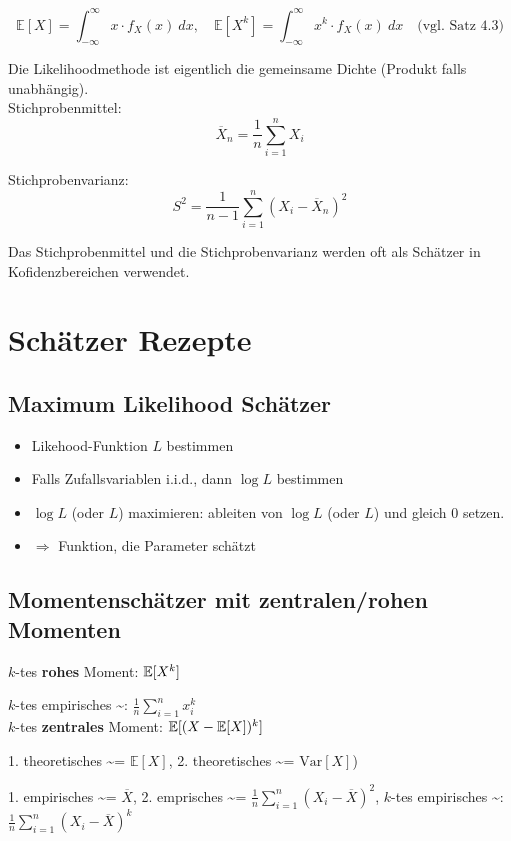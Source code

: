 $$
	\mathbb{E}[X] = \int_{-\infty}^\infty x \cdot f_X(x)\ dx,\quad
	\mathbb{E}[X^k] = \int_{-\infty}^\infty x^k \cdot f_X(x)\ dx\quad
	\text{(vgl. Satz 4.3)}
$$

Die Likelihoodmethode ist eigentlich die gemeinsame Dichte (Produkt falls unabhängig).\\

Stichprobenmittel: $$\overline{X}_n = \frac{1}{n	}\sum_{i=1}^nX_i$$

Stichprobenvarianz: $$S^2 = \frac{1}{n-1}\sum^n_{i=1}\left(X_i-\overline{X}_n\right)^2$$

Das Stichprobenmittel und die Stichprobenvarianz werden oft als Schätzer in Kofidenzbereichen verwendet.\\

\section{Schätzer Rezepte}

\subsection{Maximum Likelihood Schätzer}

\begin{itemize}
	\item Likehood-Funktion $L$ bestimmen
	\item Falls Zufallsvariablen i.i.d., dann $\log L$ bestimmen
	\item $\log L$ (oder $L$) maximieren: ableiten von $\log L$ (oder $L$) und gleich $0$ setzen.
	\item $\Rightarrow$ Funktion, die Parameter schätzt
\end{itemize}

\subsection{Momentenschätzer mit zentralen/rohen Momenten}

$k$-tes \textbf{rohes} Moment: $\mathbb{E}[X^k]$

$k$-tes empirisches \textasciitilde: $\frac{1}{n}\sum_{i=1}^nx_i^k$\\

$k$-tes \textbf{zentrales} Moment: $\mathbb{E}[(X - \mathbb{E}[X])^k]$

1. theoretisches \textasciitilde = $\mathbb{E}[X]$, 2. theoretisches \textasciitilde = $\text{Var}[X]$)

1. empirisches \textasciitilde = $\overline{X}$, 2. emprisches \textasciitilde = $\frac{1}{n}\sum_{i=1}^n(X_i-\overline{X})^2$, $k$-tes empirisches \textasciitilde: $\frac{1}{n}\sum_{i=1}^n(X_i-\overline{X})^k$

